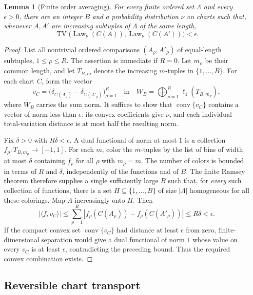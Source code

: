 \documentclass[11pt]{article}
\newtheorem{lemma}[theorem]{Lemma}
\theoremstyle{definition}
\theoremstyle{remark}
\newcommand{\abs}[1]{\left\lvert #1\right\rvert}
\newcommand{\TV}{\operatorname{TV}}
\DeclareMathOperator{\conv}{conv}
\begin{document}
\begin{lemma}[Finite order averaging]\label{lem:order-averaging}
For every finite ordered set $\Lambda$ and every $\epsilon>0$, there
are an integer $B$ and a probability distribution $\nu$ on charts such
that, whenever $A,A'$ are increasing subtuples of $\Lambda$ of the same
length,
\begin{equation}\label{eq:subtuple-TV}
 \TV\bigl(\operatorname{Law}_\nu(C(A)),
          \operatorname{Law}_\nu(C(A'))\bigr)<\epsilon.
\end{equation}
\end{lemma}

\begin{proof}
List all nontrivial ordered comparisons $(A_\rho,A'_\rho)$ of equal-length
subtuples, $1\leq\rho\leq R$. The assertion is immediate if $R=0$.
Let $m_\rho$ be their common length, and let $T_{B,m}$ denote the
increasing $m$-tuples in $\{1,\ldots,B\}$.
For each chart $C$, form the vector
\[
 v_C=\bigl(\delta_{C(A_\rho)}-\delta_{C(A'_\rho)}\bigr)_{\rho=1}^R
 \quad\text{in}\quad
 W_B=\bigoplus_{\rho=1}^R\ell_1(T_{B,m_\rho}),
\]
where $W_B$ carries the sum norm.
It suffices to show that $\conv\{v_C\}$ contains a vector of norm less
than $\epsilon$: its convex coefficients give $\nu$, and each individual
total-variation distance is at most half the resulting norm.

Fix $\delta>0$ with $R\delta<\epsilon$.
A dual functional of norm at most $1$ is a collection
$f_\rho:T_{B,m_\rho}\to[-1,1]$.
For each $m$, color the $m$-tuples by the list of bins of width at most
$\delta$ containing $f_\rho$ for all $\rho$ with $m_\rho=m$.
The number of colors is bounded in terms of $R$ and $\delta$, independently
of the functions and of $B$.
The finite Ramsey theorem therefore supplies a single sufficiently large
$B$ such that, for \emph{every} such collection of functions, there is a
set $H\subseteq\{1,\ldots,B\}$ of size $|\Lambda|$ homogeneous for all
these colorings. Map $\Lambda$ increasingly onto $H$. Then
\[
 \abs{\langle f,v_C\rangle}
 \leq\sum_{\rho=1}^R
 \abs{f_\rho(C(A_\rho))-f_\rho(C(A'_\rho))}
 \leq R\delta<\epsilon.
\]
If the compact convex set $\conv\{v_C\}$ had distance at least
$\epsilon$ from zero, finite-dimensional separation would give a dual
functional of norm $1$ whose value on every $v_C$ is at least
$\epsilon$, contradicting the preceding bound.
Thus the required convex combination exists.
\end{proof}

\subsection{Reversible chart transport}\label{sec:chart-chain}
\end{document}
